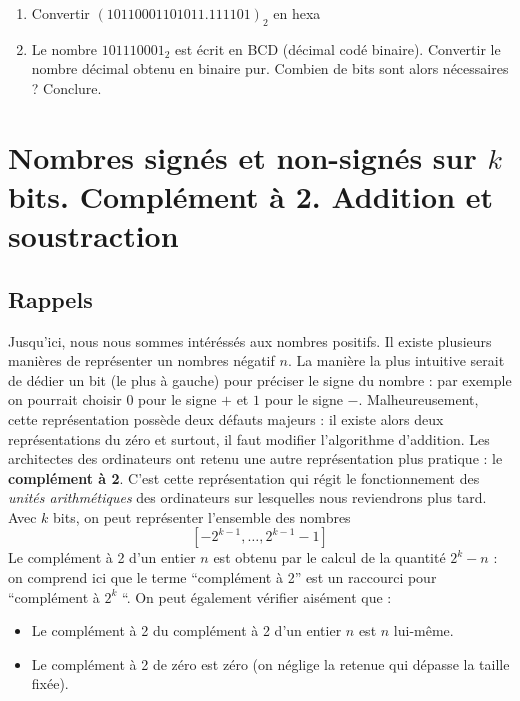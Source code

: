 \documentclass[a4paper,11pt]{article}
\begin{document}
\begin{enumerate}
\item { Convertir  $(10110001101011.111101 )_2$ en hexa}\\

\item {Le nombre $101110001_2$ est écrit en BCD (décimal codé binaire). Convertir le nombre décimal obtenu en binaire pur. Combien de bits sont alors nécessaires ? Conclure.}\\
%

\end{enumerate}

\section{Nombres signés et non-signés sur $k$ bits. Complément à 2. Addition et soustraction}

\subsection*{Rappels} Jusqu'ici, nous nous sommes intéréssés aux nombres positifs. Il existe plusieurs manières de représenter un nombres négatif $n$. La manière la plus intuitive serait de dédier un bit (le plus à gauche) pour préciser le signe du nombre : par exemple on pourrait choisir $0$ pour le signe $+$ et $1$ pour le signe $-$. Malheureusement, cette représentation possède deux défauts majeurs : il existe alors deux représentations du zéro et surtout, il faut modifier l'algorithme d'addition. Les architectes des ordinateurs ont retenu une autre représentation plus pratique : le {\bf complément à 2}. C'est cette représentation qui régit le fonctionnement des {\it unités arithmétiques} des ordinateurs sur lesquelles nous reviendrons plus tard.\\

Avec $k$ bits, on peut représenter l'ensemble des nombres $$[-2^{k-1},\dots,2^{k-1}-1]$$ Le complément à 2 d'un entier $n$ est obtenu par le calcul de la quantité $2^k - n$ : on comprend ici que le terme ``complément à 2'' est un raccourci pour ``complément à $2^k$ ``. On peut également vérifier aisément que :
\begin{itemize}
\item Le complément à 2 du complément à 2 d'un entier $n$ est $n$ lui-même.
\item Le complément à 2 de zéro est zéro (on néglige la retenue qui dépasse la taille fixée).
\end{itemize}
\end{document}
